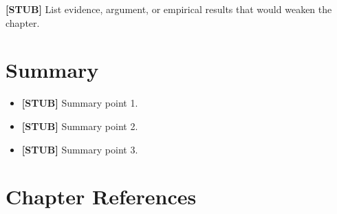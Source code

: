 \textbf{[STUB]} List evidence, argument, or empirical results that would weaken the chapter.

\section{Summary}

\begin{itemize}
  \item \textbf{[STUB]} Summary point 1.
  \item \textbf{[STUB]} Summary point 2.
  \item \textbf{[STUB]} Summary point 3.
\end{itemize}

\section*{Chapter References}

